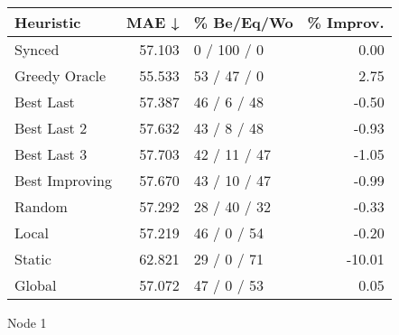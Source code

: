\begin{tabular}{lrlr}
\toprule
\textbf{Heuristic} & \textbf{MAE ↓} & \textbf{\% Be/Eq/Wo} & \textbf{\% Improv.} \\
\midrule
            Synced &         57.103 &          0 / 100 / 0 &                0.00 \\
     Greedy Oracle &         55.533 &          53 / 47 / 0 &                2.75 \\
         Best Last &         57.387 &          46 / 6 / 48 &               -0.50 \\
       Best Last 2 &         57.632 &          43 / 8 / 48 &               -0.93 \\
       Best Last 3 &         57.703 &         42 / 11 / 47 &               -1.05 \\
    Best Improving &         57.670 &         43 / 10 / 47 &               -0.99 \\
            Random &         57.292 &         28 / 40 / 32 &               -0.33 \\
             Local &         57.219 &          46 / 0 / 54 &               -0.20 \\
            Static &         62.821 &          29 / 0 / 71 &              -10.01 \\
            Global &         57.072 &          47 / 0 / 53 &                0.05 \\
\bottomrule
\end{tabular}
\caption{Node 1}
\label{tab:non_lr05_le2_bs2_1}
